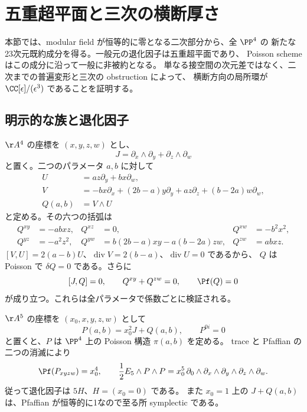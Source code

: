 \section{五重超平面と三次の横断厚さ}\label{sec:zero_log}

本節では、modular field が恒等的に零となる二次部分から、全 $\PP^4$ の
新たな23次元既約成分を得る。一般元の退化因子は五重超平面であり、
Poisson scheme はこの成分に沿って一般に非被約となる。
単なる接空間の次元差ではなく、二次までの普遍変形と三次の obstruction によって、
横断方向の局所環が $\CC[\epsilon]/(\epsilon^3)$ であることを証明する。

\subsection{明示的な族と退化因子}
$\AA^4$ の座標を $(x,y,z,w)$ とし、
\[
 J=\partial_x\wedge\partial_y+\partial_z\wedge\partial_w
\]
と置く。二つのパラメータ $a,b$ に対して
\begin{align*}
 U&=az\partial_y+bx\partial_w,\\
 V&=-bx\partial_x+(2b-a)y\partial_y
      +az\partial_z+(b-2a)w\partial_w,\\
 Q(a,b)&=V\wedge U
\end{align*}
と定める。その六つの括弧は
\begin{equation}\label{eq:zeroQ}
\begin{aligned}
 Q^{xy}&=-abxz,&Q^{xz}&=0,&Q^{xw}&=-b^2x^2,\\
 Q^{yz}&=-a^2z^2,&Q^{yw}&=b(2b-a)xy-a(b-2a)zw,&Q^{zw}&=abxz.
\end{aligned}
\end{equation}
$[V,U]=2(a-b)U$、$\operatorname{div}V=2(b-a)$、$\operatorname{div}U=0$ であるから、
$Q$ は Poisson で $\delta Q=0$ である。さらに
\[
 [J,Q]=0,\qquad Q^{xy}+Q^{zw}=0,\qquad \Pf(Q)=0
\]
が成り立つ。これらは全パラメータで係数ごとに検証される。

$\AA^5$ の座標を $(x_0,x,y,z,w)$ として
\[
 P(a,b)=x_0^2J+Q(a,b),\qquad P^{0i}=0
\]
と置くと、$P$ は $\PP^4$ 上の Poisson 構造 $\pi(a,b)$ を定める。
trace と Pfaffian の二つの消滅により
\[
 \Pf(P_{xyzw})=x_0^4,\qquad
 \frac12E_5\wedge P\wedge P
 =x_0^5\,\partial_0\wedge\partial_x\wedge\partial_y\wedge\partial_z\wedge\partial_w.
\]
従って退化因子は $5H$、$H=(x_0=0)$ である。
また $x_0=1$ 上の $J+Q(a,b)$ は、Pfaffian が恒等的に1なので至る所 symplectic である。


